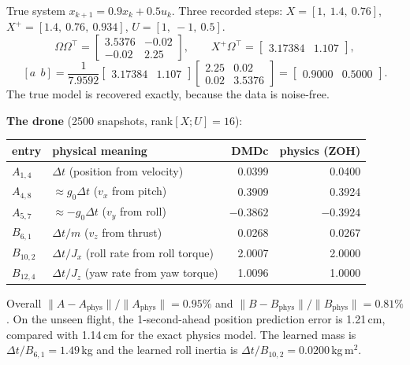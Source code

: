 \begin{toybox}
True system $x_{k+1}=0.9x_k+0.5u_k$. Three recorded steps:
$X=[1,\ 1.4,\ 0.76]$, $X^+=[1.4,\ 0.76,\ 0.934]$, $U=[1,\ -1,\ 0.5]$.
\[
\Omega\Omega^\top=\begin{bmatrix}3.5376&-0.02\\-0.02&2.25\end{bmatrix},\qquad
X^+\Omega^\top=\begin{bmatrix}3.17384&1.107\end{bmatrix},
\]
\[
[a\ \ b]=\frac{1}{7.9592}\begin{bmatrix}3.17384&1.107\end{bmatrix}\begin{bmatrix}2.25&0.02\\0.02&3.5376\end{bmatrix}
=\begin{bmatrix}0.9000&0.5000\end{bmatrix}.
\]
The true model is recovered exactly, because the data is noise-free.

\textbf{The drone} (2500 snapshots, rank$[X;U]=16$):
\begin{center}\small
\begin{tabular}{@{}llrr@{}}
\toprule
entry & physical meaning & DMDc & physics (ZOH)\\
\midrule
$A_{1,4}$ & $\Delta t$ (position from velocity) & 0.0399 & 0.0400\\
$A_{4,8}$ & $\approx g_0\Delta t$ ($v_x$ from pitch) & 0.3909 & 0.3924\\
$A_{5,7}$ & $\approx-g_0\Delta t$ ($v_y$ from roll) & $-0.3862$ & $-0.3924$\\
$B_{6,1}$ & $\Delta t/m$ ($v_z$ from thrust) & 0.0268 & 0.0267\\
$B_{10,2}$ & $\Delta t/J_x$ (roll rate from roll torque) & 2.0007 & 2.0000\\
$B_{12,4}$ & $\Delta t/J_z$ (yaw rate from yaw torque) & 1.0096 & 1.0000\\
\bottomrule
\end{tabular}
\end{center}
Overall $\|A-A_{\text{phys}}\|/\|A_{\text{phys}}\|=0.95\%$ and $\|B-B_{\text{phys}}\|/\|B_{\text{phys}}\|=0.81\%$. On the unseen
flight, the 1-second-ahead position prediction error is 1.21\,cm, compared with 1.14\,cm for the exact physics
model. The learned mass is $\Delta t/B_{6,1}=1.49$\,kg and the learned roll inertia is $\Delta t/B_{10,2}=0.0200$\,kg\,m$^2$.
\end{toybox}

